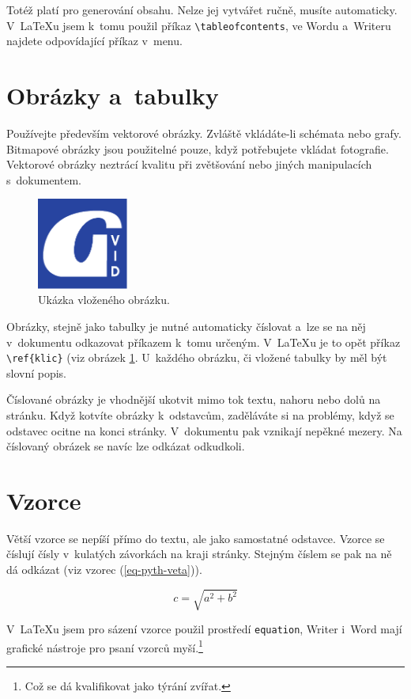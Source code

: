 Totéž platí pro generování obsahu. Nelze jej vytvářet ručně, musíte automaticky. V~{\LaTeX}u jsem k~tomu použil příkaz \verb+\tableofcontents+, ve Wordu a~Writeru najdete odpovídající příkaz v~menu.

\section{Obrázky a~tabulky}
Používejte především vektorové obrázky. Zvláště vkládáte-li schémata nebo grafy. Bitmapové obrázky jsou použitelné pouze, když potřebujete vkládat fotografie. Vektorové obrázky neztrácí kvalitu při zvětšování nebo jiných manipulacích s~dokumentem.

\begin{figure}[t]
  \centering
  \includegraphics[width=3cm]{img/icon-gvid-blue-40mm.pdf}
  \caption{Ukázka vloženého obrázku.}
  \label{fig:obrazek}
\end{figure}


Obrázky, stejně jako tabulky je nutné automaticky číslovat a~lze se na něj v~dokumentu odkazovat příkazem k~tomu určeným. V~{\LaTeX}u je to opět příkaz \verb+\ref{klic}+ (viz obrázek \ref{fig:obrazek}. U~každého obrázku, či vložené tabulky by měl být slovní popis.

Číslované obrázky je vhodnější ukotvit mimo tok textu, nahoru nebo dolů na stránku. Když kotvíte obrázky k~odstavcům, zaděláváte si na problémy, když se odstavec ocitne na konci stránky. V~dokumentu pak vznikají nepěkné mezery. Na číslovaný obrázek se navíc lze odkázat odkudkoli.

\section{Vzorce}
Větší vzorce se nepíší přímo do textu, ale jako samostatné odstavce. Vzorce se číslují čísly v~kulatých závorkách na kraji stránky. Stejným číslem se pak na ně dá odkázat (viz vzorec (\ref{eq-pyth-veta})).

\begin{equation}\label{eq-pyth-veta}
  c = \sqrt{a^2 + b^2}
\end{equation}

V~\LaTeX{u} jsem pro sázení vzorce použil prostředí \verb+equation+, Writer i~Word mají grafické nástroje pro psaní vzorců myší.\footnote{Což se dá kvalifikovat jako týrání zvířat.}

